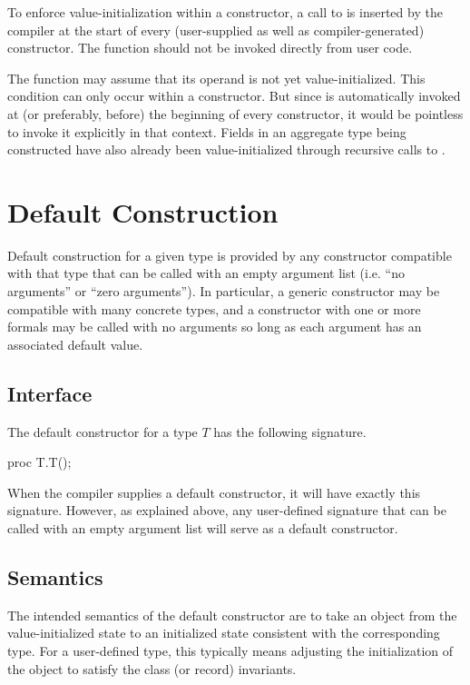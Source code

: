 To enforce value-initialization within a constructor, a call to  is
inserted by the compiler at the start of every (user-supplied as well as
compiler-generated) constructor.  The  function should not be
invoked directly from user code.

\begin{rationale}

The  function may assume that its operand is not yet
value-initialized.  This condition can only occur within a constructor.  But since
 is automatically invoked at (or preferably, before) the
beginning of every constructor, it would be pointless to invoke it explicitly in
that context. Fields in an aggregate type being constructed have also already been
value-initialized through recursive calls to .

\end{rationale}

\section{Default Construction}

Default construction for a given type is provided by any constructor compatible
with that type that can be called with an empty argument list (i.e. ``no
arguments'' or ``zero arguments'').  In particular, a generic constructor may be
compatible with many concrete types, and a constructor with one or more formals
may be called with no arguments so long as each argument has an associated
default value.

\subsection{Interface}

The default constructor for a type $T$ has the following signature.
\begin{chapel}
proc T.T();
\end{chapel}
When the compiler supplies a default constructor, it will have exactly this
signature.  However, as explained above, any user-defined signature that can be
called with an empty argument list will serve as a default constructor.

\subsection{Semantics}

The intended semantics of the default constructor are to take an object from the
value-initialized state to an initialized state consistent with the
corresponding type.  For a user-defined type, this typically means adjusting the
initialization of the object to satisfy the class (or record) invariants.

